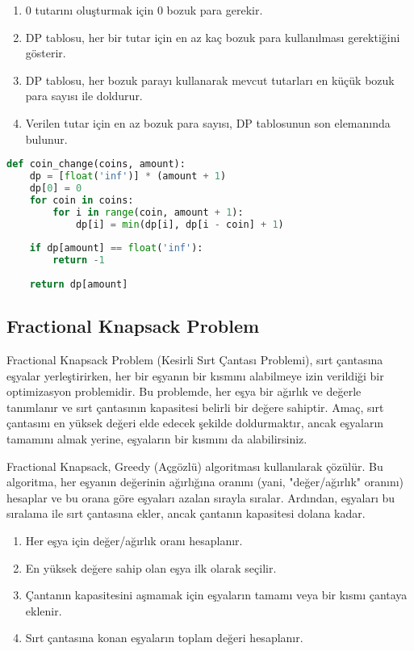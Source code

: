 \begin{enumerate}
    \item 0 tutarını oluşturmak için 0 bozuk para gerekir.
    \item DP tablosu, her bir tutar için en az kaç bozuk para kullanılması gerektiğini gösterir.
    \item DP tablosu, her bozuk parayı kullanarak mevcut tutarları en küçük bozuk para sayısı ile doldurur.
    \item Verilen tutar için en az bozuk para sayısı, DP tablosunun son elemanında bulunur.
\end{enumerate}

\begin{lstlisting}[language=Python]
def coin_change(coins, amount):
    dp = [float('inf')] * (amount + 1)
    dp[0] = 0
    for coin in coins:
        for i in range(coin, amount + 1):
            dp[i] = min(dp[i], dp[i - coin] + 1)
    
    if dp[amount] == float('inf'):
        return -1
        
    return dp[amount]
\end{lstlisting}

\newpage

\subsection{Fractional Knapsack Problem}

Fractional Knapsack Problem (Kesirli Sırt Çantası Problemi), sırt çantasına eşyalar yerleştirirken, her bir eşyanın bir kısmını alabilmeye izin verildiği bir optimizasyon problemidir. Bu problemde, her eşya bir ağırlık ve değerle tanımlanır ve sırt çantasının kapasitesi belirli bir değere sahiptir. Amaç, sırt çantasını en yüksek değeri elde edecek şekilde doldurmaktır, ancak eşyaların tamamını almak yerine, eşyaların bir kısmını da alabilirsiniz.

Fractional Knapsack, Greedy (Açgözlü) algoritması kullanılarak çözülür. Bu algoritma, her eşyanın değerinin ağırlığına oranını (yani, "değer/ağırlık" oranını) hesaplar ve bu orana göre eşyaları azalan sırayla sıralar. Ardından, eşyaları bu sıralama ile sırt çantasına ekler, ancak çantanın kapasitesi dolana kadar.

\begin{enumerate}
    \item Her eşya için değer/ağırlık oranı hesaplanır.
    \item En yüksek değere sahip olan eşya ilk olarak seçilir.
    \item Çantanın kapasitesini aşmamak için eşyaların tamamı veya bir kısmı çantaya eklenir.
    \item Sırt çantasına konan eşyaların toplam değeri hesaplanır.
\end{enumerate}

